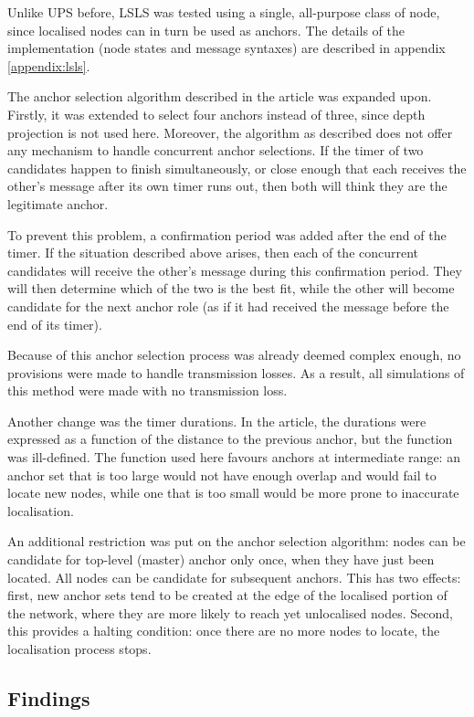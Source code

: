 \documentclass[12pt,a4paper,fleqn]{report}
\begin{document}
Unlike UPS before, LSLS was tested using a single, all-purpose class of node, since localised nodes can in turn be used as anchors. The details of the implementation (node states and message syntaxes) are described in appendix \ref{appendix:lsls}.

The anchor selection algorithm described in the article \cite{lsls} was expanded upon. Firstly, it was extended to select four anchors instead of three, since depth projection is not used here. Moreover, the algorithm as described does not offer any mechanism to handle concurrent anchor selections. If the timer of two candidates happen to finish simultaneously, or close enough that each receives the other's message after its own timer runs out, then both will think they are the legitimate anchor.

To prevent this problem, a confirmation period was added after the end of the timer. If the situation described above arises, then each of the concurrent candidates will receive the other's message during this confirmation period. They will then determine which of the two is the best fit, while the other will become candidate for the next anchor role (as if it had received the message before the end of its timer).

Because of this anchor selection process was already deemed complex enough, no provisions were made to handle transmission losses. As a result, all simulations of this method were made with no transmission loss.

Another change was the timer durations. In the article, the durations were expressed as a function of the distance to the previous anchor, but the function was ill-defined. The function used here favours anchors at intermediate range: an anchor set that is too large would not have enough overlap and would fail to locate new nodes, while one that is too small would be more prone to inaccurate localisation.

An additional restriction was put on the anchor selection algorithm: nodes can be candidate for top-level (master) anchor only once, when they have just been located. All nodes can be candidate for subsequent anchors. This has two effects: first, new anchor sets tend to be created at the edge of the localised portion of the network, where they are more likely to reach yet unlocalised nodes. Second, this provides a halting condition: once there are no more nodes to locate, the localisation process stops.

\subsection{Findings}
\end{document}
